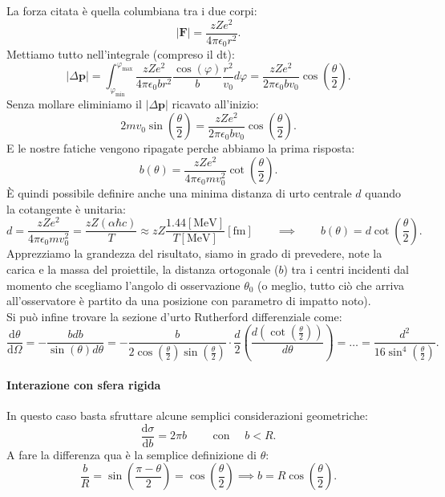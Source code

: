 La forza citata è quella columbiana tra i due corpi:
\[
\left|\boldsymbol{F}\right| = \frac{zZe^2}{4 \pi \epsilon_0 r^2} 
.\] 
Mettiamo tutto nell'integrale (compreso il dt):
\[
	\left| \Delta \boldsymbol{p} \right| = \int_{\varphi_{\text{min}}}^{\varphi_{\text{max}}} \frac{zZe^2}{4 \pi \epsilon_0 b r^2} \frac{\cos\left( \varphi \right) }{b} \frac{r^2}{v_0} d \varphi 
	=  \frac{zZe^2}{2 \pi \epsilon_0 b v_0} \cos\left( \frac{\theta}{2} \right) 
.\] 
Senza mollare eliminiamo il $\left| \Delta \boldsymbol{p} \right|$ ricavato all'inizio:
\[
	2mv_0 \sin\left( \frac{\theta}{2} \right) = \frac{zZe^2}{2 \pi \epsilon_0 b v_0} \cos\left( \frac{\theta}{2} \right) 
.\] 
E le nostre fatiche vengono ripagate perche abbiamo la prima risposta:
\[
	b\left( \theta \right) = \frac{zZe^2}{4 \pi \epsilon_0 m  v_0^2} \cot\left( \frac{\theta}{2} \right) 
.\] 
È quindi possibile definire anche una minima distanza di urto centrale $d$ quando la cotangente è unitaria:
\[
	d = \frac{zZe^2}{4 \pi \epsilon_0 m  v_0^2} = \frac{zZ\left( \alpha \hbar c \right)}{T} \approx zZ \frac{1.44[\text{MeV}]}{T[\text{MeV}]} [\text{fm}]
	\quad \quad \implies \quad \quad b\left( \theta \right) = d \cot\left( \frac{\theta}{2} \right) 
.\] \label{eq:d-rutherford}
Apprezziamo la grandezza del risultato, siamo in grado di prevedere, note la carica e la massa del proiettile, la distanza ortogonale ($b$) tra i centri incidenti dal momento che scegliamo l'angolo di osservazione $\theta_0$ (o meglio, tutto ciò che arriva all'osservatore è partito da una posizione con parametro di impatto noto).\\
Si può infine trovare la sezione d'urto Rutherford differenziale come:
\[
	\frac{\mbox{d} \theta}{\mbox{d} \Omega} = -\frac{b db}{\sin\left( \theta \right) d \theta} =
	-\frac{b}{2 \cos\left( \frac{\theta}{2} \right) \sin\left( \frac{\theta}{2} \right)} \cdot \frac{d}{2}\left( \frac{d \left( \cot\left( \frac{\theta}{2} \right)\right)}{d \theta} \right) = 
	\ldots = \frac{d^2}{16 \sin^{4}\left( \frac{\theta}{2} \right) } 
.\] 

\paragraph{Interazione con sfera rigida}
In questo caso basta sfruttare alcune semplici considerazioni geometriche:
\[
	\frac{\text{d}\sigma}{\text{d} b} = 2 \pi b \quad \quad \text{ con } \quad b<R 
.\] 
A fare la differenza qua è la semplice definizione di $\theta$:
\[
	\frac{b}{R} = \sin\left( \frac{\pi - \theta}{2} \right) = \cos\left( \frac{\theta}{2} \right)  \implies b = R \cos\left( \frac{\theta}{2} \right) 
.\] 

